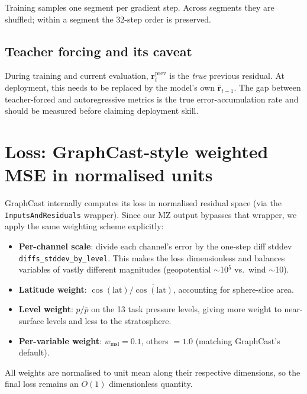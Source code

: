 \documentclass[11pt,a4paper]{article}
\begin{document}
Training samples one segment per gradient step. Across segments they are shuffled; within a segment the 32-step order is preserved.

\subsection{Teacher forcing and its caveat}

During training and current evaluation, $\mathbf{r}^{\text{prev}}_t$ is the \emph{true} previous residual. At deployment, this needs to be replaced by the model's own $\widehat{\mathbf{r}}_{t-1}$. The gap between teacher-forced and autoregressive metrics is the true error-accumulation rate and should be measured before claiming deployment skill.

\section{Loss: GraphCast-style weighted MSE in normalised units}
\label{sec:loss}

GraphCast internally computes its loss in normalised residual space (via the \texttt{InputsAndResiduals} wrapper). Since our MZ output bypasses that wrapper, we apply the same weighting scheme explicitly:
\begin{itemize}[nosep]
  \item \textbf{Per-channel scale}: divide each channel's error by the one-step diff stddev \texttt{diffs\_stddev\_by\_level}. This makes the loss dimensionless and balances variables of vastly different magnitudes (geopotential $\sim$10$^5$ vs.\ wind $\sim$10).
  \item \textbf{Latitude weight}: $\cos(\mathrm{lat}) / \overline{\cos(\mathrm{lat})}$, accounting for sphere-slice area.
  \item \textbf{Level weight}: $p / \bar{p}$ on the 13 task pressure levels, giving more weight to near-surface levels and less to the stratosphere.
  \item \textbf{Per-variable weight}: $w_{\text{msl}} = 0.1$, others $= 1.0$ (matching GraphCast's default).
\end{itemize}
All weights are normalised to unit mean along their respective dimensions, so the final loss remains an $O(1)$ dimensionless quantity.
\end{document}
